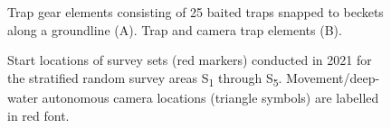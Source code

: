\documentclass[12pt]{article}\usepackage[]{graphicx}\usepackage[]{color}
\begin{document}
\begin{figure}[htb]

{\centering {} 

}

\caption{Trap gear elements consisting of 25 baited traps snapped to beckets along a groundline (A). Trap and camera trap elements (B).}\label{fig:figure3}
\end{figure}
\clearpage


\begin{figure}[htb]

{\centering {} 

}

\caption{Start locations of survey sets (red markers) conducted in 2021 for the stratified random survey areas S\textsubscript{1} through S\textsubscript{5}. Movement/deep-water autonomous camera locations (triangle symbols) are labelled in red font.}\label{fig:figure4}
\end{figure}
\clearpage
\end{document}
